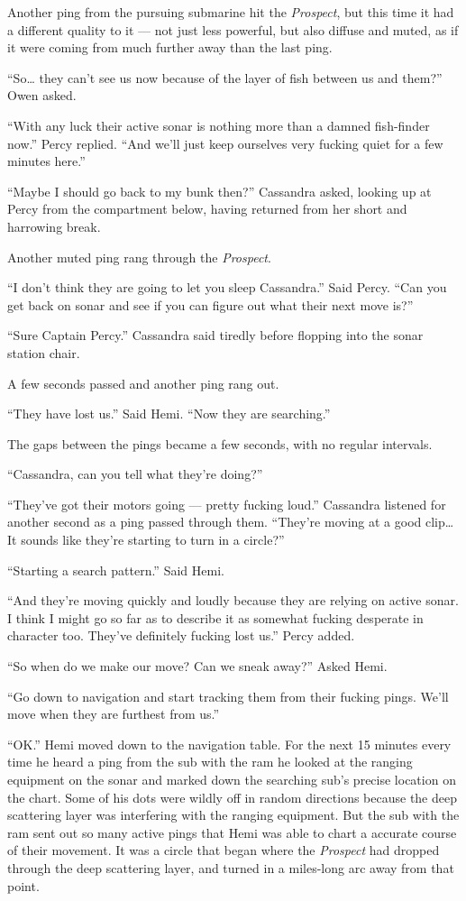 \documentclass[
]{scrbook}
\begin{document}
Another ping from the pursuing submarine hit the \emph{Prospect}, but
this time it had a different quality to it --- not just less powerful,
but also diffuse and muted, as if it were coming from much further away
than the last ping.

``So\ldots{} they can't see us now because of the layer of fish between
us and them?'' Owen asked.

``With any luck their active sonar is nothing more than a damned
fish-finder now.'' Percy replied. ``And we'll just keep ourselves very
fucking quiet for a few minutes here.''

``Maybe I should go back to my bunk then?'' Cassandra asked, looking up
at Percy from the compartment below, having returned from her short and
harrowing break.

Another muted ping rang through the \emph{Prospect}.

``I don't think they are going to let you sleep Cassandra.'' Said Percy.
``Can you get back on sonar and see if you can figure out what their
next move is?''

``Sure Captain Percy.'' Cassandra said tiredly before flopping into the
sonar station chair.

A few seconds passed and another ping rang out.

``They have lost us.'' Said Hemi. ``Now they are searching.''

The gaps between the pings became a few seconds, with no regular
intervals.

``Cassandra, can you tell what they're doing?''

``They've got their motors going --- pretty fucking loud.'' Cassandra
listened for another second as a ping passed through them. ``They're
moving at a good clip\ldots{} It sounds like they're starting to turn in
a circle?''

``Starting a search pattern.'' Said Hemi.

``And they're moving quickly and loudly because they are relying on
active sonar. I think I might go so far as to describe it as somewhat
fucking desperate in character too. They've definitely fucking lost
us.'' Percy added.

``So when do we make our move? Can we sneak away?'' Asked Hemi.

``Go down to navigation and start tracking them from their fucking
pings. We'll move when they are furthest from us.''

``OK.'' Hemi moved down to the navigation table. For the next 15 minutes
every time he heard a ping from the sub with the ram he looked at the
ranging equipment on the sonar and marked down the searching sub's
precise location on the chart. Some of his dots were wildly off in
random directions because the deep scattering layer was interfering with
the ranging equipment. But the sub with the ram sent out so many active
pings that Hemi was able to chart a accurate course of their movement.
It was a circle that began where the \emph{Prospect} had dropped through
the deep scattering layer, and turned in a miles-long arc away from that
point.
\end{document}

